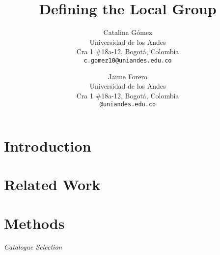 \documentclass[10pt,twocolumn,letterpaper]{article}
\begin{document}
\title{Defining the Local Group}

\author{Catalina G\'omez\\
Universidad de los Andes \\
Cra 1 \#18a-12, Bogot\'a, Colombia\\
{\tt\small c.gomez10@uniandes.edu.co}
\and 
Jaime Forero\\
Universidad de los Andes\\
Cra 1 \#18a-12, Bogot\'a, Colombia\\
{\tt\small @uniandes.edu.co}
}

\maketitle

 \begin{abstract}

 \end{abstract}


\section{Introduction}
 
\section{Related Work}









\section{Methods}
\textit{Catalogue Selection}

 


{\small



}

\pagebreak
\end{document}
